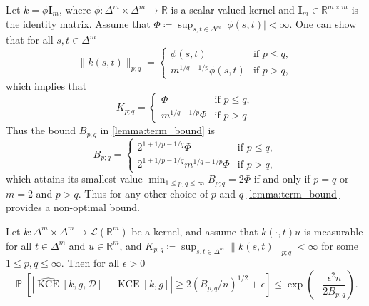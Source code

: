 \documentclass{article}
\DeclareMathOperator{\Prob}{\mathbb{P}}
\DeclareMathOperator{\kernelmeasure}{KCE}
\begin{document}
\begin{example}
  Let $k = \phi \mathbf{I}_m$, where
  $\phi \colon \Delta^m \times \Delta^m \to \mathbb{R}$ is a scalar-valued
  kernel and $\mathbf{I}_m \in \mathbb{R}^{m \times m}$ is the identity matrix.
  Assume that $\Phi \coloneqq \sup_{s,t \in \Delta^m} |\phi(s,t)| < \infty$. One
  can show that for all $s,t \in \Delta^m$
  \begin{equation*}
    \|k(s,t)\|_{p;q} = \begin{cases}
      \phi(s,t) & \text{if } p \leq q,\\
      m^{1/q - 1/p} \phi(s,t) & \text{if } p > q,
    \end{cases}
  \end{equation*}
  which implies that
  \begin{equation*}
    K_{p;q} = \begin{cases}
      \Phi & \text{if } p \leq q,\\
      m^{1/q - 1/p} \Phi & \text{if } p > q.
    \end{cases}
  \end{equation*}
  Thus the bound $B_{p;q}$ in \cref{lemma:term_bound} is
  \begin{equation*}
    B_{p; q} = \begin{cases}
      2^{1 + 1/p - 1/q} \Phi & \text{if } p \leq q,\\
      2^{1 + 1/p - 1/q} m^{1/q - 1/p} \Phi & \text{if } p > q,
    \end{cases}
  \end{equation*}
  which attains its smallest value
  $\min_{1 \leq p,q \leq \infty} B_{p;q} = 2 \Phi$ if and only if $p = q$ or
  $m = 2$ and $p > q$. Thus for any other choice of $p$ and $q$
  \cref{lemma:term_bound} provides a non-optimal bound.
\end{example}

\begin{theorem}\label{thm:biased_bound_uniform_general}
  Let $k \colon \Delta^m \times \Delta^m \to \mathcal{L}(\mathbb{R}^m)$ be a
  kernel, and assume that $k(\cdot, t)u$ is measurable for all $t \in \Delta^m$
  and $u \in \mathbb{R}^m$, and
  $K_{p;q} \coloneqq \sup_{s,t \in \Delta^m} \|k(s,t)\|_{p;q} < \infty$ for some
  $1 \leq p,q \leq \infty$. Then for all $\epsilon > 0$
  \begin{equation*}
    \Prob\left[\left|\widehat{\kernelmeasure}[k, g, \mathcal{D}] - \kernelmeasure[k, g]\right| \geq 2{(B_{p;q}/n)}^{1/2} + \epsilon\right] \leq \exp{\left(-\frac{\epsilon^2 n}{2 B_{p;q}}\right)}.
  \end{equation*}
\end{theorem}
\end{document}
